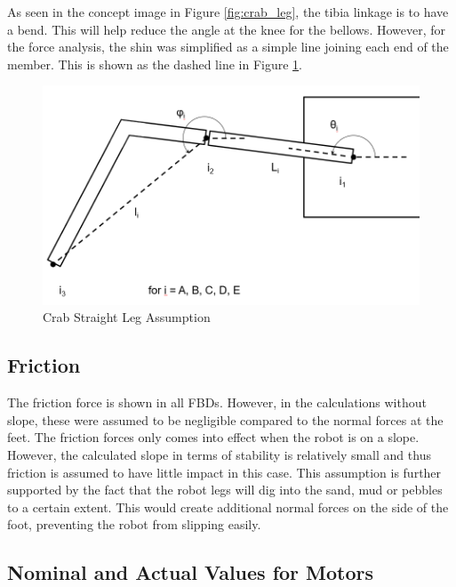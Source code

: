 As seen in the concept image in Figure \ref{fig:crab_leg}, the tibia linkage is to have a bend. This will help reduce the angle at the knee for the bellows. However, for the force analysis, the shin was simplified as a simple line joining each end of the member. This is shown as the dashed line in Figure \ref{fig:robot_leg_assumption}. 

\begin{figure}
    \centering
    \includegraphics[width=\textwidth]{4_ComponentProperties/img/robot_leg_assumption.PNG}
    \caption{Crab Straight Leg Assumption}
    \label{fig:robot_leg_assumption}
\end{figure}

\subsection{Friction}

The friction force is shown in all FBDs. However, in the calculations without slope, these were assumed to be negligible compared to the normal forces at the feet. 
The friction forces only comes into effect when the robot is on a slope. However, the calculated slope in terms of stability is relatively small and thus friction is assumed to have little impact in this case. This assumption is further supported by the fact that the robot legs will dig into the sand, mud or pebbles to a certain extent. This would create additional normal forces on the side of the foot, preventing the robot from slipping easily.

\subsection{Nominal and Actual Values for Motors}
\label{sec:ass_motors}

